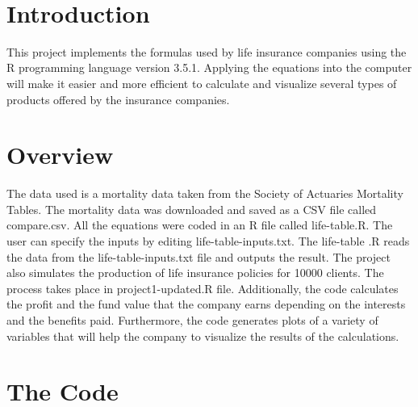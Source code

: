 \documentclass[12pt]{article}
\makeatletter
\let\thedate\@date
\makeatother
\begin{document}
\begin{titlepage}
		{\large \thedate}\\[1 cm]
		
		\vfill
		
	\end{titlepage}
	
	
	\tableofcontents
	\pagebreak
	\lstlistoflistings
	\listoffigures
	\pagebreak
	
	
	
	\section{Introduction}
This project implements the formulas used by life insurance companies using the R programming language version 3.5.1. Applying the equations into the computer will make it easier and more efficient to calculate and visualize several types of products offered by the insurance companies. 
\section{Overview}
The data used is a mortality data taken from the Society of Actuaries Mortality Tables. The mortality data was downloaded and saved as a CSV file called compare.csv.  All the equations were coded in an R file called life-table.R.  The user can specify the inputs by editing life-table-inputs.txt. The life-table .R reads the data from the life-table-inputs.txt file and outputs the result. The project also simulates the production of life insurance policies for 10000 clients.  The process takes place in project1-updated.R file. Additionally, the code calculates the profit and the fund value that the company earns depending on the interests and the benefits paid. Furthermore, the code generates plots of a variety of variables that will help the company to visualize the results of the calculations.
\section{The Code}
\end{document}
